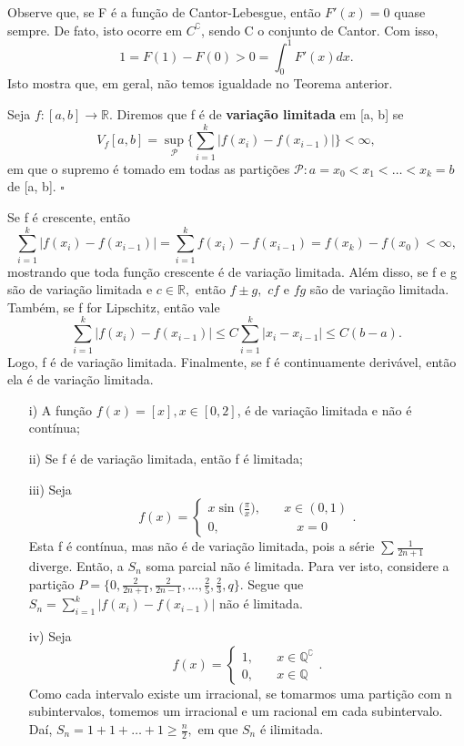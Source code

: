 \documentclass[MeasureTheory/measure_theory.tex]{subfiles}
\begin{document}
Observe que, se F é a função de Cantor-Lebesgue, então \(F'(x) = 0\) quase sempre. De fato, isto ocorre em \(C ^{\complement}\), sendo C o conjunto de Cantor. Com isso,
\[
	1 = F(1) - F(0) > 0 = \int_{0}^{1}F'(x)dx.
\]
Isto mostra que, em geral, não temos igualdade no Teorema anterior.
\begin{def*}
	Seja \(f:[a, b]\rightarrow \mathbb{R}\). Diremos que f é de \textbf{variação limitada} em [a, b] se
	\[
		V_f[a, b] = \sup_{\mathcal{P}}\biggl\{\sum\limits_{i=1}^{k}|f(x_{i}) - f(x_{i-1})|\biggr\} < \infty,
	\]
	em que o supremo é tomado em todas as partições \(\mathcal{P}: a = x_{0} < x_1 < \dotsc <x_{k} = b\) de [a, b]. \(\square\)
\end{def*}
Se f é crescente, então
\[
	\sum\limits_{i=1}^{k} |f(x_{i}) - f(x_{i-1})| = \sum\limits_{i=1}^{k}f(x_{i}) - f(x_{i-1}) = f(x_{k}) - f(x_{0}) < \infty,
\]
mostrando que toda função crescente é de variação limitada. Além disso, se f e g são de variação limitada e \(c\in \mathbb{R},\) então \(f\pm g,\) \(cf\) e \(fg\) são de variação limitada. Também, se f for Lipschitz, então vale
\[
	\sum\limits_{i=1}^{k}|f(x_{i}) - f(x_{i-1})| \leq C \sum\limits_{i=1}^{k}|x_{i}-x_{i-1}| \leq C(b-a).
\]
Logo, f é de variação limitada. Finalmente, se f é continuamente derivável, então ela é de variação limitada.
\begin{example}
	\begin{itemize}
		\item[i)] A função \(f(x) = [x], x\in [0, 2]\), é de variação limitada e não é contínua;
		\item[ii)] Se f é de variação limitada, então f é limitada;
		\item[iii)] Seja
		      \[
			      f(x) = \left\{\begin{array}{ll}
				      x\sin^{}{\biggl(\frac{\pi }{x}\biggr)},\quad & x\in (0 ,1) \\
				      0,                                           & \quad x = 0
			      \end{array}\right..
		      \]
		      Esta f é contínua, mas não é de variação limitada, pois a série \(\sum\limits_{}^{}\frac{1}{2n+1}\) diverge. Então, a \(S_{n}\) soma parcial não é limitada. Para ver isto, considere a partição \(P = \biggl\{0, \frac{2}{2n+1}, \frac{2}{2n-1}, \dotsc , \frac{2}{5}, \frac{2}{3}, q\biggr\}.\) Segue que \(S_{n} = \sum\limits_{i=1}^{k}|f(x_{i}) - f(x_{i-1})|\) não
		      é limitada.
		\item[iv)] Seja
		      \[
			      f(x) = \left\{\begin{array}{ll}
				      1, & \quad x\in \mathbb{Q}^{\complement} \\
				      0, & \quad x\in \mathbb{Q}
			      \end{array}\right..
		      \]
		      Como cada intervalo existe um irracional, se tomarmos uma partição com n subintervalos, tomemos um irracional e um racional em cada subintervalo. Daí, \(S_{n} = 1 + 1 +\dotsc +1\geq \frac{n}{2},\) em que \(S_{n}\) é ilimitada.
	\end{itemize}
\end{example}
\end{document}
